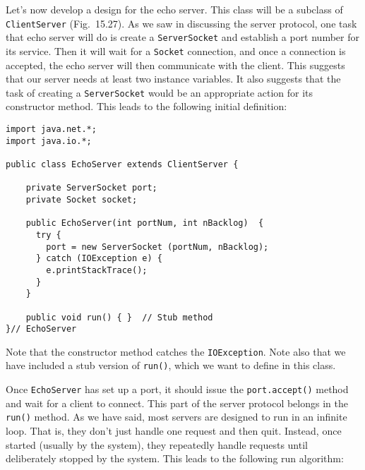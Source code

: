 \noindent Let's now develop a design for the echo server.  This class will be a
subclass of {\tt ClientServer} (Fig.~15.27). As we saw in
discussing the server protocol, one task that echo server will do is
create a {\tt ServerSocket} and establish a port number for its
service.  Then it will wait for a {\tt Socket} connection, and once a
connection is accepted, the echo server will then communicate with the client.
This suggests that
our server needs at least two instance variables.  It also suggests
that the task of creating a {\tt ServerSocket} would be an appropriate
action for its constructor method.  This leads to the following initial
definition:

\begin{jjjlisting}
\begin{lstlisting}
import java.net.*;
import java.io.*;

public class EchoServer extends ClientServer {

    private ServerSocket port;
    private Socket socket;

    public EchoServer(int portNum, int nBacklog)  {
      try {
        port = new ServerSocket (portNum, nBacklog);
      } catch (IOException e) {
        e.printStackTrace();
      }
    }

    public void run() { }  // Stub method
}// EchoServer
\end{lstlisting}
\end{jjjlisting}

\noindent Note that the constructor method catches the {\tt IOException}.
Note also that we have included a stub version of {\tt run()}, which
we want to define in this class.

Once {\tt EchoServer} has set up a port, it should issue the
{\tt port.accept()} method and wait for a client to connect.  This part
of the server protocol belongs in the {\tt run()} method.   As we have said, most servers
are designed to run in an infinite loop.  That is, they don't just
handle one request and then quit.  Instead, once started (usually by
the system), they repeatedly handle requests until deliberately
stopped by the system.  This leads to the following run algorithm:

